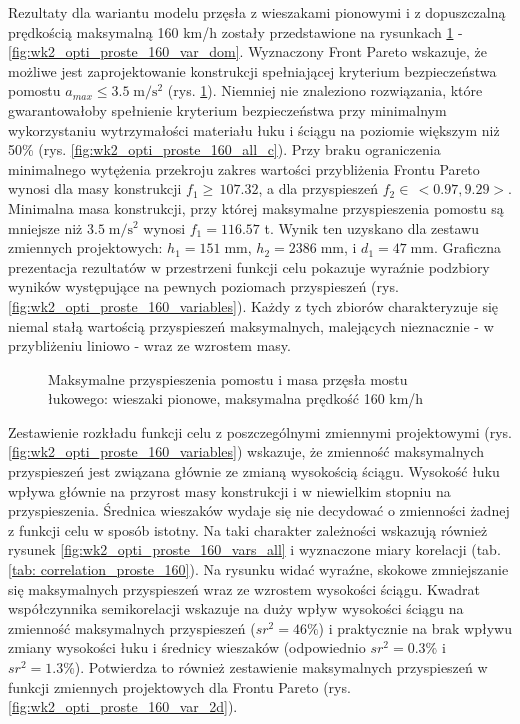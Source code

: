 Rezultaty dla wariantu modelu przęsła z wieszakami pionowymi i z dopuszczalną prędkością maksymalną 160 km/h zostały przedstawione na rysunkach \ref{fig:wk2_opti_proste_160_all} - \ref{fig:wk2_opti_proste_160_var_dom}. Wyznaczony Front Pareto wskazuje, że możliwe jest zaprojektowanie konstrukcji spełniającej kryterium bezpieczeństwa pomostu $a_{max}\le 3.5\;\mathrm{m/s^2}$ (rys. \ref{fig:wk2_opti_proste_160_all}). Niemniej nie znaleziono rozwiązania, które gwarantowałoby spełnienie kryterium bezpieczeństwa przy minimalnym wykorzystaniu wytrzymałości materiału łuku i ściągu na poziomie większym niż 50\% (rys. \ref{fig:wk2_opti_proste_160_all_c}). Przy braku ograniczenia minimalnego wytężenia przekroju zakres wartości przybliżenia Frontu Pareto wynosi dla masy konstrukcji $f_1 \ge \,107.32$, a dla przyspieszeń $f_2 \in\,<0.97,9.29>$. Minimalna masa konstrukcji, przy której maksymalne przyspieszenia pomostu są mniejsze niż $3.5\;\mathrm{m/s^2}$ wynosi $f_1 = 116.57$ t. Wynik ten uzyskano dla zestawu zmiennych projektowych: $h_1 = 151\;\mathrm{mm}$, $h_2 = 2386\;\mathrm{mm}$, i $d_1 = 47\;\mathrm{mm}$. Graficzna prezentacja rezultatów w przestrzeni funkcji celu pokazuje wyraźnie podzbiory wyników występujące na pewnych poziomach przyspieszeń (rys. \ref{fig:wk2_opti_proste_160_variables}). Każdy z tych zbiorów charakteryzuje się niemal stałą wartością przyspieszeń maksymalnych, malejących nieznacznie - w przybliżeniu liniowo - wraz ze wzrostem masy.
\begin{figure}[hbt!]
	\centering
	\captionsetup{justification=centering}
	\caption{Maksymalne przyspieszenia pomostu i masa przęsła mostu łukowego: wieszaki pionowe, maksymalna prędkość 160 km/h}
	\label{fig:wk2_opti_proste_160_all}
\end{figure}

Zestawienie rozkładu funkcji celu z poszczególnymi zmiennymi projektowymi (rys. \ref{fig:wk2_opti_proste_160_variables}) wskazuje, że zmienność maksymalnych przyspieszeń jest związana głównie ze zmianą wysokością ściągu. Wysokość łuku wpływa głównie na przyrost masy konstrukcji i w niewielkim stopniu na przyspieszenia. Średnica wieszaków wydaje się nie decydować o zmienności żadnej z funkcji celu w sposób istotny. Na taki charakter zależności wskazują również rysunek \ref{fig:wk2_opti_proste_160_vars_all} i wyznaczone miary korelacji (tab. \ref{tab: correlation_proste_160}). Na rysunku widać wyraźne, skokowe zmniejszanie się maksymalnych przyspieszeń wraz ze wzrostem wysokości ściągu. Kwadrat współczynnika semikorelacji wskazuje na duży wpływ wysokości ściągu na zmienność maksymalnych przyspieszeń ($sr^2=46\%$) i praktycznie na brak wpływu zmiany wysokości łuku i średnicy wieszaków (odpowiednio $sr^2=0.3\%$ i $sr^2=1.3\%$). Potwierdza to również zestawienie maksymalnych przyspieszeń w funkcji zmiennych projektowych dla Frontu Pareto (rys. \ref{fig:wk2_opti_proste_160_var_2d}).

